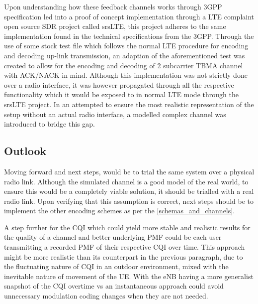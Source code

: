 \documentclass{article}
\begin{document}
Upon understanding how these feedback channels works through 3GPP specification led into a proof of concept implementation through a LTE complaint open source SDR project called srsLTE, this project adheres to the same implementation found in the technical specifications from the 3GPP. Through the use of some stock test file which follows the normal LTE procedure for encoding and decoding up-link transmission, an adaption of the aforementioned test was created to allow for the encoding and decoding of 2 subcarrier TBMA channel with ACK/NACK in mind. Although this implementation was not strictly done over a radio interface, it was however propagated through all the respective functionality which it would be exposed to in normal LTE mode through the srsLTE project. In an attempted to ensure the most realistic representation of the setup without an actual radio interface, a modelled complex channel was introduced to bridge this gap. 


\subsection{Outlook}
Moving forward and next steps, would be to trial the same system over a physical radio link. Although the simulated channel is a good model of the real world, to ensure this would be a completely viable solution, it should be trialled with a real radio link. Upon verifying that this assumption is correct, next steps should be to implement the other encoding schemes as per the \cref{schemas_and_channels}. 

A step further for the CQI which could yield more stable and realistic results for the quality of a channel and better underlying PMF could be each user transmitting a recorded PMF of their respective CQI over time. This approach might be more realistic than its counterpart in the previous paragraph, due to the fluctuating nature of CQI in an outdoor environment, mixed with the inevitable nature of movement of the \ac{UE}. With the eNB having a more generalist snapshot of the CQI overtime vs an instantaneous approach could avoid unnecessary modulation coding changes when they are not needed. 

\end{document}
